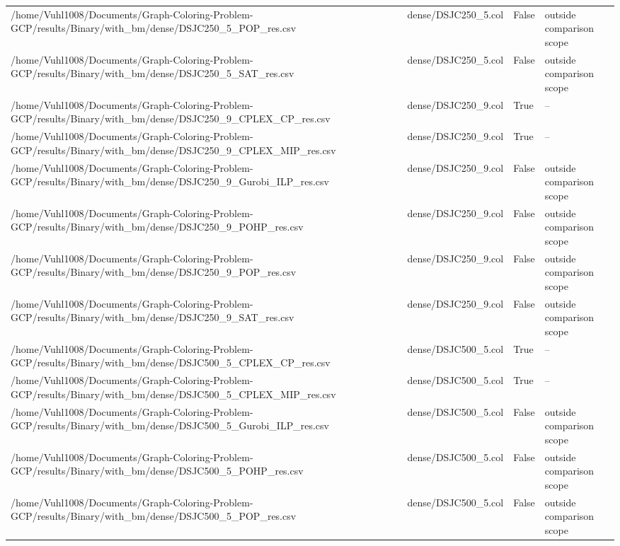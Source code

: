 \begin{table}[htbp]
\begin{tabular}{llll}
/home/Vuhl1008/Documents/Graph-Coloring-Problem-GCP/results/Binary/with\_bm/dense/DSJC250\_5\_POP\_res.csv & dense/DSJC250\_5.col & False & outside comparison scope \\
/home/Vuhl1008/Documents/Graph-Coloring-Problem-GCP/results/Binary/with\_bm/dense/DSJC250\_5\_SAT\_res.csv & dense/DSJC250\_5.col & False & outside comparison scope \\
/home/Vuhl1008/Documents/Graph-Coloring-Problem-GCP/results/Binary/with\_bm/dense/DSJC250\_9\_CPLEX\_CP\_res.csv & dense/DSJC250\_9.col & True & -- \\
/home/Vuhl1008/Documents/Graph-Coloring-Problem-GCP/results/Binary/with\_bm/dense/DSJC250\_9\_CPLEX\_MIP\_res.csv & dense/DSJC250\_9.col & True & -- \\
/home/Vuhl1008/Documents/Graph-Coloring-Problem-GCP/results/Binary/with\_bm/dense/DSJC250\_9\_Gurobi\_ILP\_res.csv & dense/DSJC250\_9.col & False & outside comparison scope \\
/home/Vuhl1008/Documents/Graph-Coloring-Problem-GCP/results/Binary/with\_bm/dense/DSJC250\_9\_POHP\_res.csv & dense/DSJC250\_9.col & False & outside comparison scope \\
/home/Vuhl1008/Documents/Graph-Coloring-Problem-GCP/results/Binary/with\_bm/dense/DSJC250\_9\_POP\_res.csv & dense/DSJC250\_9.col & False & outside comparison scope \\
/home/Vuhl1008/Documents/Graph-Coloring-Problem-GCP/results/Binary/with\_bm/dense/DSJC250\_9\_SAT\_res.csv & dense/DSJC250\_9.col & False & outside comparison scope \\
/home/Vuhl1008/Documents/Graph-Coloring-Problem-GCP/results/Binary/with\_bm/dense/DSJC500\_5\_CPLEX\_CP\_res.csv & dense/DSJC500\_5.col & True & -- \\
/home/Vuhl1008/Documents/Graph-Coloring-Problem-GCP/results/Binary/with\_bm/dense/DSJC500\_5\_CPLEX\_MIP\_res.csv & dense/DSJC500\_5.col & True & -- \\
/home/Vuhl1008/Documents/Graph-Coloring-Problem-GCP/results/Binary/with\_bm/dense/DSJC500\_5\_Gurobi\_ILP\_res.csv & dense/DSJC500\_5.col & False & outside comparison scope \\
/home/Vuhl1008/Documents/Graph-Coloring-Problem-GCP/results/Binary/with\_bm/dense/DSJC500\_5\_POHP\_res.csv & dense/DSJC500\_5.col & False & outside comparison scope \\
/home/Vuhl1008/Documents/Graph-Coloring-Problem-GCP/results/Binary/with\_bm/dense/DSJC500\_5\_POP\_res.csv & dense/DSJC500\_5.col & False & outside comparison scope \\

\end{tabular}
\end{table}
